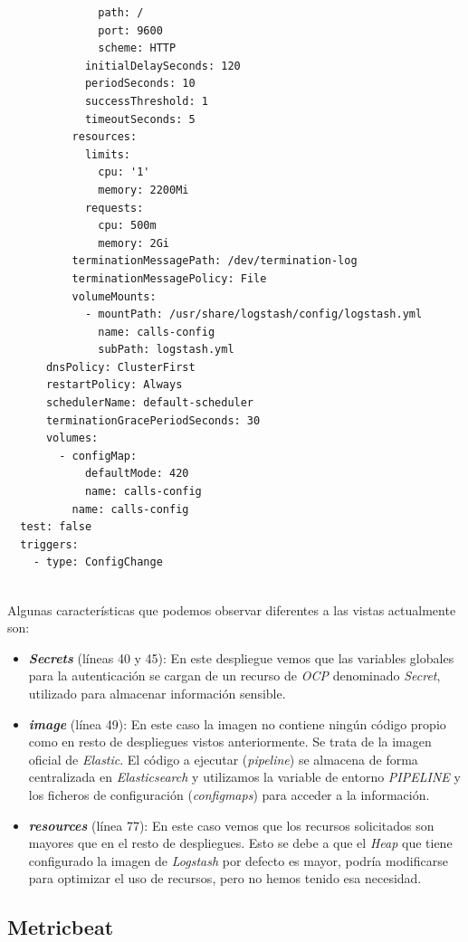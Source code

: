 \begin{verbatim}
              path: /
              port: 9600
              scheme: HTTP
            initialDelaySeconds: 120
            periodSeconds: 10
            successThreshold: 1
            timeoutSeconds: 5
          resources:
            limits:
              cpu: '1'
              memory: 2200Mi
            requests:
              cpu: 500m
              memory: 2Gi
          terminationMessagePath: /dev/termination-log
          terminationMessagePolicy: File
          volumeMounts:
            - mountPath: /usr/share/logstash/config/logstash.yml
              name: calls-config
              subPath: logstash.yml
      dnsPolicy: ClusterFirst
      restartPolicy: Always
      schedulerName: default-scheduler
      terminationGracePeriodSeconds: 30
      volumes:
        - configMap:
            defaultMode: 420
            name: calls-config
          name: calls-config
  test: false
  triggers:
    - type: ConfigChange
 
\end{verbatim}

 Algunas características que podemos observar diferentes a las vistas actualmente son: 
 
 \begin{itemize}
 \item \textit{\textbf{Secrets}} (líneas 40 y 45): En este despliegue vemos que las variables globales para la autenticación se cargan de un recurso de \textit{OCP} denominado \textit{Secret}, utilizado para almacenar información sensible.
 \item  \textit{\textbf{image}} (línea 49): En este caso la imagen no contiene ningún código propio como en resto de despliegues vistos anteriormente. Se trata de la imagen oficial de \textit{Elastic}. El código a ejecutar (\textit{pipeline}) se almacena de forma centralizada en \textit{Elasticsearch} y utilizamos la variable de entorno \textit{PIPELINE} y los ficheros de configuración (\textit{configmaps}) para acceder a la información. 
 \item \textit{\textbf{resources}} (línea 77): En este caso vemos que los recursos solicitados son mayores que en el resto de despliegues. Esto se debe a que el \textit{Heap} que tiene configurado la imagen de \textit{Logstash} por defecto es mayor, podría modificarse para optimizar el uso de recursos, pero no hemos tenido esa necesidad.
 \end{itemize}



\subsection{Metricbeat}

